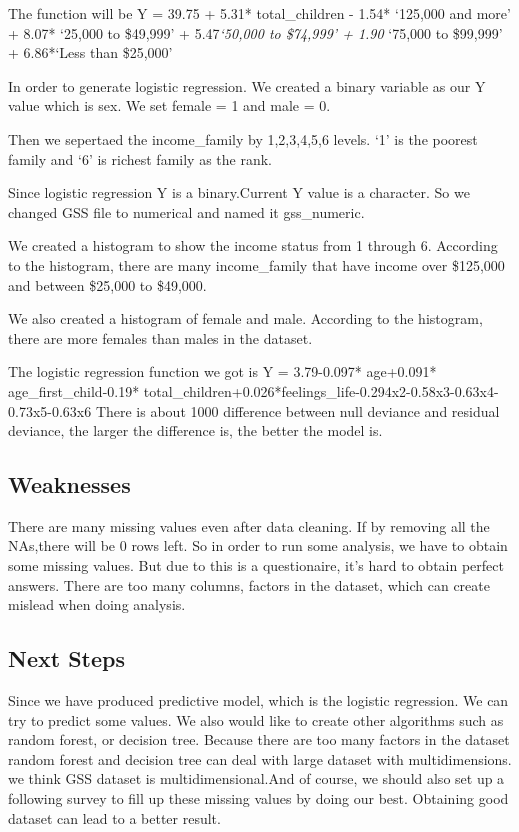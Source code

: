 \documentclass[
]{article}
\begin{document}
The function will be Y = 39.75 + 5.31* total\_children - 1.54* `125,000
and more' + 8.07* `25,000 to \$49,999' + 5.47\emph{`50,000 to \$74,999'
+ 1.90} `75,000 to \$99,999' + 6.86*`Less than \$25,000'

In order to generate logistic regression. We created a binary variable
as our Y value which is sex. We set female = 1 and male = 0.

Then we sepertaed the income\_family by 1,2,3,4,5,6 levels. `1' is the
poorest family and `6' is richest family as the rank.

Since logistic regression Y is a binary.Current Y value is a character.
So we changed GSS file to numerical and named it gss\_numeric.

We created a histogram to show the income status from 1 through 6.
According to the histogram, there are many income\_family that have
income over \$125,000 and between \$25,000 to \$49,000.

We also created a histogram of female and male. According to the
histogram, there are more females than males in the dataset.

The logistic regression function we got is Y = 3.79-0.097* age+0.091*
age\_first\_child-0.19*
total\_children+0.026*feelings\_life-0.294x2-0.58x3-0.63x4-0.73x5-0.63x6
There is about 1000 difference between null deviance and residual
deviance, the larger the difference is, the better the model is.

\hypertarget{weaknesses}{%
\subsection{Weaknesses}\label{weaknesses}}

There are many missing values even after data cleaning. If by removing
all the NAs,there will be 0 rows left. So in order to run some analysis,
we have to obtain some missing values. But due to this is a
questionaire, it's hard to obtain perfect answers. There are too many
columns, factors in the dataset, which can create mislead when doing
analysis.

\hypertarget{next-steps}{%
\subsection{Next Steps}\label{next-steps}}

Since we have produced predictive model, which is the logistic
regression. We can try to predict some values. We also would like to
create other algorithms such as random forest, or decision tree. Because
there are too many factors in the dataset random forest and decision
tree can deal with large dataset with multidimensions. we think GSS
dataset is multidimensional.And of course, we should also set up a
following survey to fill up these missing values by doing our best.
Obtaining good dataset can lead to a better result.
\end{document}
